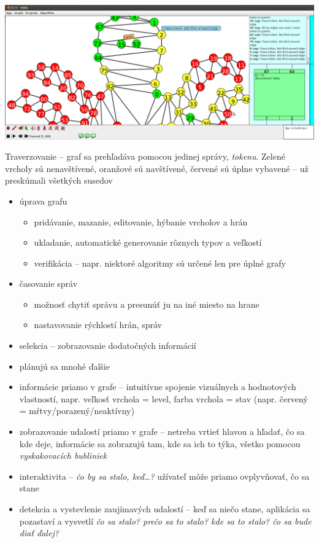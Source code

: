 \includegraphics[width=\columnwidth]{traverz}
\caption{Traverzovanie -- graf sa prehľadáva pomocou jedinej správy, \emph{tokenu}. Zelené vrcholy
sú nenavštívené, oranžové sú navštívené, červené sú úplne vybavené -- už preskúmali všetkých susedov}

    

\begin{itemize}
    \item úprava grafu
    \begin{itemize}
        \item pridávanie, mazanie, editovanie, hýbanie vrcholov a hrán
        \item ukladanie, automatické generovanie rôznych typov a veľkostí
        \item verifikácia -- napr. niektoré algoritmy sú určené len pre úplné grafy
    \end{itemize}
    \item časovanie správ
    \begin{itemize}
        \item možnosť chytiť správu a presunúť ju na iné miesto na hrane
        \item nastavovanie rýchlostí hrán, správ
    \end{itemize}
    \item selekcia -- zobrazovanie dodatočných informácií
    \item plánujú sa mnohé ďalšie


\end{itemize}


\begin{itemize}

    \item informácie priamo v grafe -- intuitívne spojenie vizuálnych a hodnotových
    vlastností, napr. veľkosť vrchola = level, farba vrchola = stav (napr. červený =
    mŕtvy/porazený/neaktívny)
    \item zobrazovanie udalostí priamo v grafe -- netreba vrtieť hlavou a hľadať, čo sa kde deje,
    informácie sa zobrazujú tam, kde sa ich to týka, všetko pomocou \emph{vyskakovacích bubliniek}
    \item interaktivita -- \emph{čo by sa stalo, keď\dots?} užívateľ môže priamo ovplyvňovať, čo sa
    stane
    \item detekcia a vystevlenie zaujímavých udalostí -- keď sa niečo stane, aplikácia sa pozastaví a vysvetlí
    \emph{čo sa stalo? prečo sa to stalo? kde sa to stalo? čo sa bude diať ďalej?}

\end{itemize}

